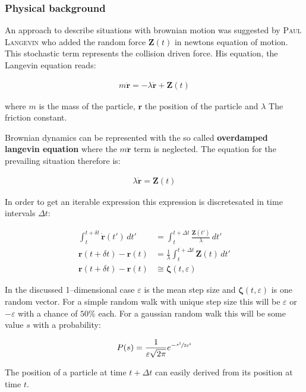 \documentclass[a4paper, parskip=half]{scrartcl}
\newcommand{\person}[1]{%
	\textsc{#1}%
}
\newcommand{\effect}[1]{%
	\textbf{#1}%
}
\begin{document}
\subsubsection{Physical background}
An approach to describe situations with brownian motion was suggested by \person{Paul Langevin} who added the random force $\mathbf{Z}(t)$ in newtons equation of motion. This stochastic term represents the collision driven force. His equation, the Langevin equation reads:

\begin{align}
m \ddot{\mathbf{r}} = -\lambda\dot{\mathbf{r}} + \mathbf{Z}(t)
\end{align}

where $m$ is the mass of the particle, $\mathbf{r}$ the position of the particle and $\lambda$ The friction constant.

Brownian dynamics can be represented with the so called \effect{overdamped langevin equation} where the $m \ddot{\mathbf{r}}$ term is neglected. The equation for the prevailing situation therefore is:

\begin{align}
\lambda\dot{\mathbf{r}} = \mathbf{Z}(t)
\end{align}

In order to get an iterable expression this expression is discretesated in time intervals $\Delta t$:

\begin{align}
\int_t^{t+ \delta t} \dot{\mathbf{r}}(t')\, dt' &= \int_t^{t+ \Delta t} \frac{\mathbf{Z}(t')}{\lambda}\, dt' \\
\mathbf{r}(t + \delta t) - \mathbf{r}(t) &= \frac{1}{\lambda} \int_t^{t+ \Delta t} \mathbf{Z}(t)\, dt'\\
\mathbf{r}(t + \delta t) - \mathbf{r}(t) &\cong \boldsymbol{\zeta}(t, \varepsilon)
\end{align}

In the discussed 1--dimensional case $\varepsilon$ is the mean step size and $\boldsymbol{\zeta}(t, \varepsilon)$ is one random vector. For a simple random walk with unique step size this will be $\varepsilon$ or $-\varepsilon$ with a chance of $50\%$ each. For a gaussian random walk this will be some value $s$ with a probability:

\begin{align}
P(s) = \frac{1}{\varepsilon \sqrt{2\pi}} e^{-\sfrac{s^2}{2\varepsilon^2}}
\end{align} 

The position of a particle at time $t + \Delta t$ can easily derived from its position at time $t$.
\end{document}
